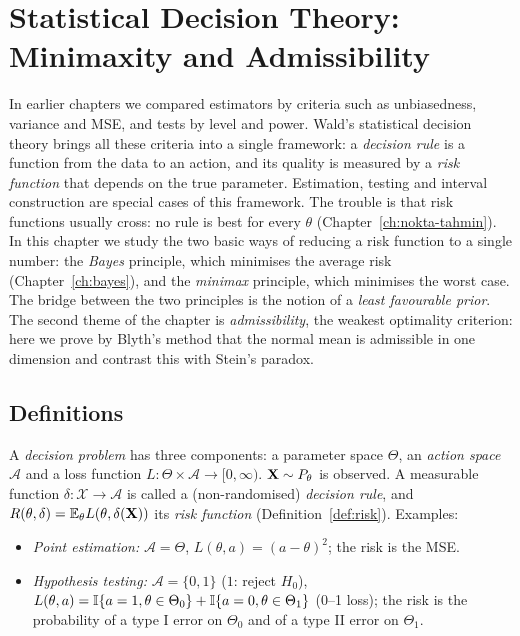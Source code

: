 \documentclass[main.tex]{subfiles}
\begin{document}
\chapter{Statistical Decision Theory: Minimaxity and Admissibility}\label{ch:karar}

In earlier chapters we compared estimators by criteria such as unbiasedness, variance and MSE, and tests by level and power. Wald's \cite{wald50} statistical decision theory brings all these criteria into a single framework: a \emph{decision rule} is a function from the data to an action, and its quality is measured by a \emph{risk function} that depends on the true parameter. Estimation, testing and interval construction are special cases of this framework. The trouble is that risk functions usually cross: no rule is best for every $\theta$ (Chapter~\ref{ch:nokta-tahmin}). In this chapter we study the two basic ways of reducing a risk function to a single number: the \emph{Bayes} principle, which minimises the average risk (Chapter~\ref{ch:bayes}), and the \emph{minimax} principle, which minimises the worst case. The bridge between the two principles is the notion of a \emph{least favourable prior}. The second theme of the chapter is \emph{admissibility}, the weakest optimality criterion: here we prove by Blyth's method that the normal mean is admissible in one dimension and contrast this with Stein's paradox.

\section{Definitions}

\begin{definition}\label{def:karar-problemi}
A \emph{decision problem} has three components: a parameter space $\Theta$, an \emph{action space} $\mathcal A$ and a loss function $L:\Theta\times\mathcal A\to[0,\infty)$. $\mathbf{X}\sim P_\theta$ is observed. A measurable function $\delta:\mathcal X\to\mathcal A$ is called a (non-randomised) \emph{decision rule}, and $R(\theta,\delta)=\mathbb{E}_\theta L(\theta,\delta(\mathbf{X}))$ its \emph{risk function} (Definition~\ref{def:risk}). Examples:
\begin{itemize}
  \item \emph{Point estimation:} $\mathcal A=\Theta$, $L(\theta,a)=(a-\theta)^2$; the risk is the MSE.
  \item \emph{Hypothesis testing:} $\mathcal A=\{0,1\}$ ($1$: reject $H_0$), $L(\theta,a)=\mathbb{I}\{a=1,\theta\in\Theta_0\}+\mathbb{I}\{a=0,\theta\in\Theta_1\}$ (0--1 loss); the risk is the probability of a type I error on $\Theta_0$ and of a type II error on $\Theta_1$.
\end{itemize}
\end{definition}
\end{document}
